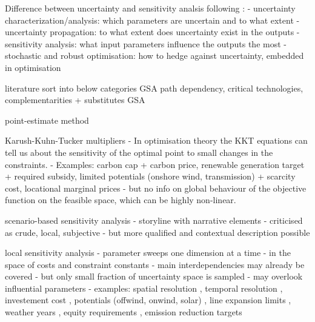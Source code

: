
Difference between uncertainty and sensitivity analsis following \cite{usher_value_2016}:
- uncertainty characterization/analysis: which parameters are uncertain and to what extent
- uncertainty propagation: to what extent does uncertainty exist in the outputs
- sensitivity analysis: what input parameters influence the outputs the most
- stochastic and robust optimisation: how to hedge against uncertainty, embedded in optimisation


literature sort into below categories
\cite{fais_impact_2016} GSA path dependency, critical technologies, complementarities + substitutes
\cite{mavromatidis_uncertainty_2018} GSA
\cite{pilpola_analyzing_2020}
\cite{schyska_sensitivity_2020}
\cite{soroudi_decision_2013}
\cite{lopion_cost_2019}
\cite{moret_robust_2016}

point-estimate method \cite{soroudi_decision_2013}

Karush-Kuhn-Tucker multipliers
- In optimisation theory the KKT equations can tell us about the sensitivity of the optimal point to small changes in the constraints.
- Examples: carbon cap + carbon price, renewable generation target + required subsidy, limited potentials (onshore wind, transmission) + scarcity cost, locational marginal prices
- but no info on global behaviour of the objective function on the feasible space, which can be highly non-linear.

scenario-based sensitivity analysis
- storyline with narrative elements \cite{DeCarolis2017}
- criticised as crude, local, subjective \cite{usher_value_2015}
- but more qualified and contextual description possible

local sensitivity analysis
- parameter sweeps one dimension at a time \cite{schlachtberger_cost_2018}
- in the space of costs and constraint constants
- main interdependencies may already be covered \cite{schlachtberger_cost_2018}
- but only small fraction of uncertainty space is sampled
- may overlook influential parameters \cite{pizarro-alonso_uncertainties_2019}
- examples: spatial resolution \cite{hoersch_spatial_2017}, temporal resolution \cite{kotzur_tsa_2018}, investement cost \cite{shirizadeh_how_2019}, potentials (offwind, onwind, solar) \cite{schlachtberger_cost_2018}, line expansion limits \cite{schlachtberger_benefits_2017}, weather years \cite{bloomfield_2021}, equity requirements \cite{sasse_regional_2020,sasse_distributional_2019}, emission reduction targets

